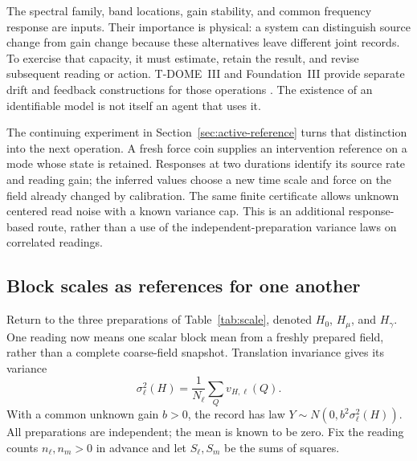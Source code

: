 \documentclass[12pt,a4paper]{article}
\begin{document}
The spectral family, band locations, gain stability, and common
frequency response are inputs. Their importance is physical:
a system can distinguish source change from gain change because these
alternatives leave different joint records. To exercise that capacity,
it must estimate, retain the result, and revise subsequent reading or
action. T-DOME~III and Foundation~III provide separate drift and
feedback constructions for those operations \cite{TDIII,FoundationIII}.
The existence of an identifiable model is not itself an agent that
uses it.

The continuing experiment in Section~\ref{sec:active-reference} turns
that distinction into the next operation. A fresh force coin supplies
an intervention reference on a mode whose state is retained. Responses
at two durations identify its source rate and reading gain; the
inferred values choose a new time scale and force on the field already
changed by calibration. The same finite certificate allows unknown
centered read noise with a known variance cap. This is an additional
response-based route, rather than a use of the independent-preparation
variance laws on correlated readings.

\subsection{Block scales as references for one another}
\label{subsec:two-scales}

Return to the three preparations of Table~\ref{tab:scale}, denoted
$H_0$, $H_\mu$, and $H_\gamma$. One reading now means one scalar
block mean from a freshly prepared field, rather than a complete
coarse-field snapshot. Translation invariance gives its variance
\[
 \sigma_\ell^2(H)=\frac1{N_\ell}\sum_Q v_{H,\ell}(Q).
\]
With a common unknown gain $b>0$, the record has law
$Y\sim N(0,b^2\sigma_\ell^2(H))$. All preparations are independent;
the mean is known to be zero. Fix the reading counts
$n_\ell,n_m>0$ in advance and let $S_\ell,S_m$ be the sums of squares.
\end{document}
